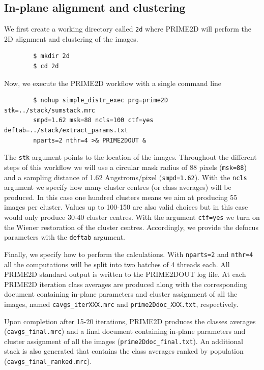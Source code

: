 \documentclass[a4paper,11pt]{article}
\begin{document}
\subsection{In-plane alignment and clustering}
We first create a working directory called \texttt{2d} where PRIME2D will perform the 2D alignment and clustering of the images.
\begin{verbatim}
        $ mkdir 2d
        $ cd 2d
\end{verbatim}
Now, we execute the PRIME2D workflow with a single command line
\begin{verbatim}
        $ nohup simple_distr_exec prg=prime2D stk=../stack/sumstack.mrc 
        smpd=1.62 msk=88 ncls=100 ctf=yes deftab=../stack/extract_params.txt 
        nparts=2 nthr=4 >& PRIME2DOUT &
\end{verbatim}
The \texttt{stk} argument points to the location of the images. Throughout the different steps of this workflow we will use a circular mask radius of 88 pixels (\texttt{msk=88}) and a sampling distance of 1.62 Angstroms/pixel (\texttt{smpd=1.62}). With the \texttt{ncls} argument we specify how many cluster centres (or class averages) will be produced. In this case one hundred clusters means we aim at producing 55 images per cluster. Values up to 100-150 are also valid choices but in this case would only produce 30-40 cluster centres. With the argument \texttt{ctf=yes} we turn on the Wiener restoration of the cluster centres. Accordingly, we provide the defocus parameters with the \texttt{deftab} argument.

Finally, we specify how to perform the calculations. With \texttt{nparts=2} and \texttt{nthr=4} all the computations will be split into two batches of 4 threads each. All PRIME2D standard output is written to the PRIME2DOUT log file. At each PRIME2D iteration class averages are produced along with the corresponding document containing in-plane parameters and cluster assignment of all the images, named \texttt{cavgs\_iterXXX.mrc} and \texttt{prime2Ddoc\_XXX.txt}, respectively.

Upon completion after 15-20 iterations, PRIME2D produces the classes averages (\texttt{cavgs\_final.mrc}) and a final document containing in-plane parameters and cluster assignment of all the images (\texttt{prime2Ddoc\_final.txt}). An additional stack is also generated that contains the class averages ranked by population (\texttt{cavgs\_final\_ranked.mrc}).
\end{document}

